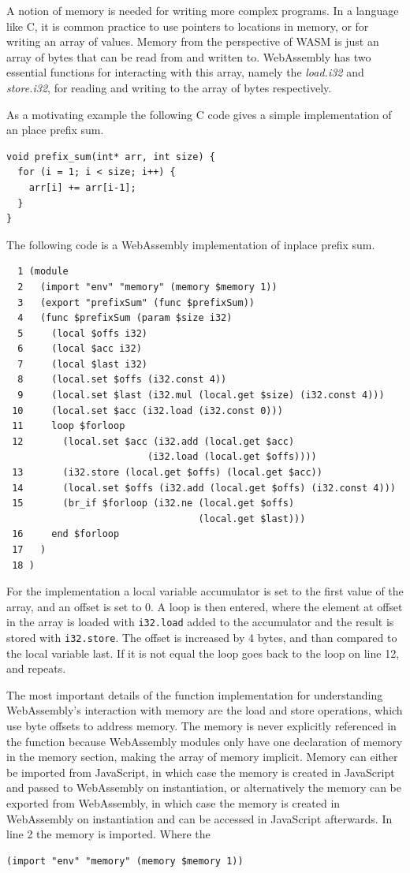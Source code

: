 \documentclass[11pt]{book}
\begin{document}
A notion of memory is needed for writing more complex programs. In a language like C, it is common practice to use pointers to locations in memory, or for writing an array of values. Memory from the perspective of WASM is just an array of bytes that can be read from and written to. WebAssembly has two essential functions for interacting with this array, namely the \textit{load.i32} and \textit{store.i32}, for reading and writing to the array of bytes respectively.

As a motivating example the following C code gives a simple implementation of an place prefix sum.

\begin{verbatim}
void prefix_sum(int* arr, int size) {
  for (i = 1; i < size; i++) {
    arr[i] += arr[i-1];
  }
}
\end{verbatim}
The following code is a WebAssembly implementation of inplace prefix sum.
\begin{verbatim}
  1 (module
  2   (import "env" "memory" (memory $memory 1))
  3   (export "prefixSum" (func $prefixSum))
  4   (func $prefixSum (param $size i32)
  5     (local $offs i32)
  6     (local $acc i32)
  7     (local $last i32)
  8     (local.set $offs (i32.const 4))
  9     (local.set $last (i32.mul (local.get $size) (i32.const 4)))
 10     (local.set $acc (i32.load (i32.const 0)))
 11     loop $forloop
 12       (local.set $acc (i32.add (local.get $acc) 
                         (i32.load (local.get $offs))))
 13       (i32.store (local.get $offs) (local.get $acc))
 14       (local.set $offs (i32.add (local.get $offs) (i32.const 4)))
 15       (br_if $forloop (i32.ne (local.get $offs) 
                                  (local.get $last)))
 16     end $forloop
 17   )
 18 )
\end{verbatim}

For the implementation a local variable accumulator is set to the first value of the array, and an offset is set to 0. A loop is then entered, where the element at offset in the array is loaded with \texttt{i32.load} added to the accumulator and the result is stored with \texttt{i32.store}. The offset is increased by 4 bytes, and than compared to the local variable last. If it is not equal the loop goes back to the loop on line 12, and repeats.

The most important details of the function implementation for understanding WebAssembly's interaction with memory are the load and store operations, which use byte offsets to address memory. The memory is never explicitly referenced in the function because WebAssembly modules only have one declaration of memory in the memory section, making the array of memory implicit. Memory can either be imported from JavaScript, in which case the memory is created in JavaScript and passed to WebAssembly on instantiation, or alternatively the memory can be exported from WebAssembly, in which case the memory is created in WebAssembly on instantiation and can be accessed in JavaScript afterwards. In line 2 the memory is imported. Where the 
\begin{verbatim}
(import "env" "memory" (memory $memory 1))
\end{verbatim}
\end{document}
